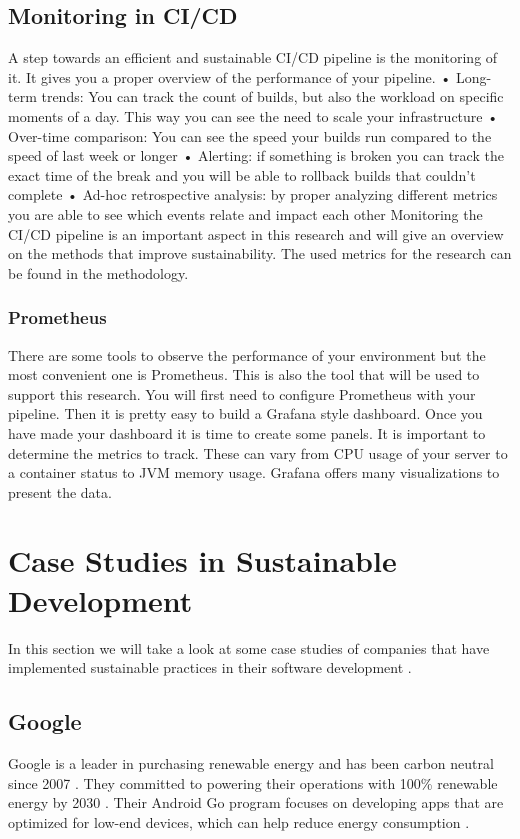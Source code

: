 \subsection{Monitoring in CI/CD}
A step towards an efficient and sustainable CI/CD pipeline is the monitoring of it. It gives you a proper overview of the performance of your pipeline. 
•	Long-term trends: You can track the count of builds, but also the workload on specific moments of a day. This way you can see the need to scale your infrastructure
•	Over-time comparison: You can see the speed your builds run compared to the speed of last week or longer
•	Alerting: if something is broken you can track the exact time of the break and you will be able to rollback builds that couldn’t complete
•	Ad-hoc retrospective analysis: by proper analyzing different metrics you are able to see which events relate and impact each other
Monitoring the CI/CD pipeline is an important aspect in this research and will give an overview on the methods that improve sustainability. The used metrics for the research can be found in the methodology.

\subsubsection{Prometheus}
There are some tools to observe the performance of your environment but the most convenient one is Prometheus. This is also the tool that will be used to support this research. You will first need to configure Prometheus with your pipeline. Then it is pretty easy to build a Grafana style dashboard. Once you have made your dashboard it is time to create some panels. It is important to determine the metrics to track. These can vary from CPU usage of your server to a container status to JVM memory usage. Grafana offers many visualizations to present the data\autocite{MetricFire2023}.



\section{Case Studies in Sustainable Development}
In this section we will take a look at some case studies of companies that have implemented sustainable practices in their software development \autocite{Corewave2023}.


\subsection{Google}
Google is a leader in purchasing renewable energy and has been carbon neutral since 2007 \autocite{Pichai2020}. They committed to powering their operations with 100\% renewable energy by 2030 \autocite{PetersonCorio2022}.
Their Android Go program focuses on developing apps that are optimized for low-end devices, which can help reduce energy consumption \autocite{Corewave2023}.


